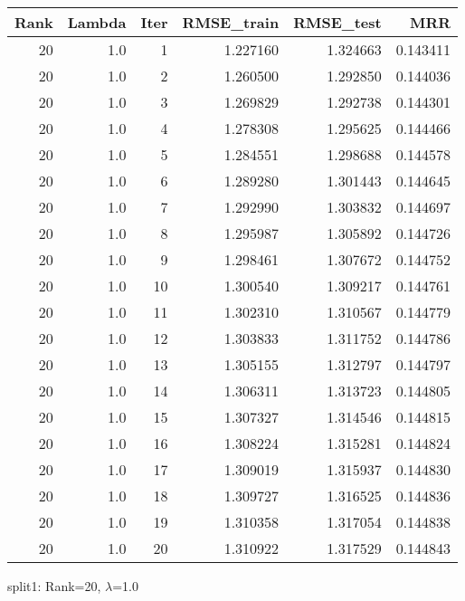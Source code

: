 \begin{tabular}{rrrrrr}
\toprule
 Rank &  Lambda &  Iter &  RMSE\_train &  RMSE\_test &       MRR \\
\midrule
   20 &     1.0 &     1 &    1.227160 &   1.324663 &  0.143411 \\
   20 &     1.0 &     2 &    1.260500 &   1.292850 &  0.144036 \\
   20 &     1.0 &     3 &    1.269829 &   1.292738 &  0.144301 \\
   20 &     1.0 &     4 &    1.278308 &   1.295625 &  0.144466 \\
   20 &     1.0 &     5 &    1.284551 &   1.298688 &  0.144578 \\
   20 &     1.0 &     6 &    1.289280 &   1.301443 &  0.144645 \\
   20 &     1.0 &     7 &    1.292990 &   1.303832 &  0.144697 \\
   20 &     1.0 &     8 &    1.295987 &   1.305892 &  0.144726 \\
   20 &     1.0 &     9 &    1.298461 &   1.307672 &  0.144752 \\
   20 &     1.0 &    10 &    1.300540 &   1.309217 &  0.144761 \\
   20 &     1.0 &    11 &    1.302310 &   1.310567 &  0.144779 \\
   20 &     1.0 &    12 &    1.303833 &   1.311752 &  0.144786 \\
   20 &     1.0 &    13 &    1.305155 &   1.312797 &  0.144797 \\
   20 &     1.0 &    14 &    1.306311 &   1.313723 &  0.144805 \\
   20 &     1.0 &    15 &    1.307327 &   1.314546 &  0.144815 \\
   20 &     1.0 &    16 &    1.308224 &   1.315281 &  0.144824 \\
   20 &     1.0 &    17 &    1.309019 &   1.315937 &  0.144830 \\
   20 &     1.0 &    18 &    1.309727 &   1.316525 &  0.144836 \\
   20 &     1.0 &    19 &    1.310358 &   1.317054 &  0.144838 \\
   20 &     1.0 &    20 &    1.310922 &   1.317529 &  0.144843 \\
\bottomrule
\end{tabular}

\caption{split1: Rank=20, $\lambda$=1.0}

